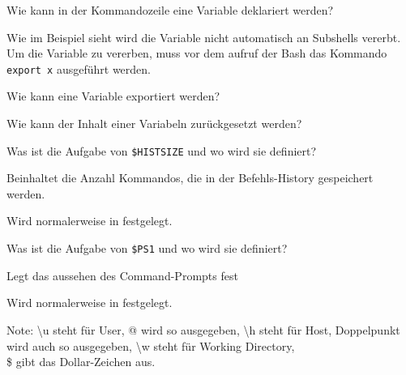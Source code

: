 \begin{flashcard}[Command]{Wie kann in der Kommandozeile eine Variable deklariert werden?}
	
	
	Wie im Beispiel sieht wird die Variable nicht automatisch an Subshells vererbt. Um die Variable zu vererben, muss vor dem aufruf der Bash das Kommando \texttt{export x} ausgeführt werden.
\end{flashcard}

\begin{flashcard}[Command]{Wie kann eine Variable exportiert werden?}
	
\end{flashcard}

\begin{flashcard}[Command]{Wie kann der Inhalt einer Variabeln zurückgesetzt werden?}
	
\end{flashcard}

\begin{flashcard}[Variable]{Was ist die Aufgabe von \texttt{\$HISTSIZE} und wo wird sie definiert?}
	\begin{description}
		\item Beinhaltet die Anzahl Kommandos, die in der Befehls-History gespeichert werden.
		
		\item Wird normalerweise in  festgelegt.
	\end{description}
\end{flashcard}

\begin{flashcard}[Variable]{Was ist die Aufgabe von \texttt{\$PS1} und wo wird sie definiert?}
	\begin{description}
		\item Legt das aussehen des Command-Prompts fest
		
		\item Wird normalerweise in  festgelegt.
	\end{description}
	
	
	
	Note: \textbackslash u steht für User, @ wird so ausgegeben, \textbackslash h steht für Host, Doppelpunkt wird auch so ausgegeben, \textbackslash w steht für Working Directory, \\\$ gibt das Dollar-Zeichen aus.
\end{flashcard}

